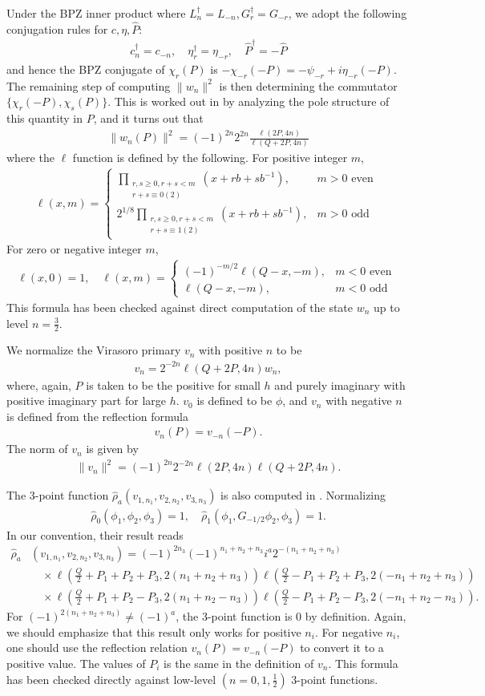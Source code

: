 \documentclass[12pt]{article}
\newcommand{\ie}{\begin{equation}\begin{aligned}}
\newcommand{\fe}{\end{aligned}\end{equation}}
\numberwithin{equation}{section}
\begin{document}
Under the BPZ inner product where $L_n^\dagger = L_{-n}, G_{r}^\dagger = G_{-r}$, we adopt the following conjugation rules for $c, \eta, \hat{P}$:
\ie
c^\dagger_n = c_{-n},\quad \eta_{r}^\dagger = \eta_{-r}, \quad \hat{P}^\dagger = -\hat{P}
\fe
and hence the BPZ conjugate of $\chi_{r}(P)$ is $-{\chi}_{-r}(-P) = -\psi_{-r}+i\eta_{-r}(-P)$. The remaining step of computing $\|w_n\|^2$ is then determining the commutator $\{\chi_r(-P), \chi_s(P)\}$. This is worked out in \cite{1312.4520} by analyzing the pole structure of this quantity in $P$, and it turns out that
\ie
\|w_n(P)\|^2 = (-1)^{2n} 2^{2n} \frac{\ell(2P,4n)}{\ell(Q+2P,4n)}
\fe
where the $\ell$ function is defined by the following. For positive integer $m$,
\ie
\ell(x, m)= \begin{cases}\prod_{\substack{r, s \geq 0, r+s<m \\ r+s \equiv 0(2)}}\left(x+r b+s b^{-1}\right), & m>0 \text { even } \\ 2^{1 / 8} \prod_{\substack{r, s \geq 0, r+s<m \\ r+s \equiv 1(2)}}\left(x+r b+s b^{-1}\right), & m>0 \text { odd }\end{cases}
\fe
For zero or negative integer $m$, 
\ie
\ell(x, 0)=1, \quad \ell(x, m)= \begin{cases}(-1)^{-m / 2} \ell(Q-x,-m), & m<0 \text { even } \\ \ell(Q-x,-m), & m<0 \text { odd }\end{cases}
\fe
This formula has been checked against direct computation of the state $w_n$ up to level $n=\frac{3}{2}$.

We normalize the Virasoro primary $v_n$ with positive $n$ to be
\ie
v_n = 2^{-2n} \ell(Q+2P, 4n)w_n,
\fe
where, again, $P$ is taken to be the positive for small $h$ and purely imaginary with positive imaginary part for large $h$. $v_0$ is defined to be $\phi$, and $v_{n}$ with negative $n$ is defined from the reflection formula
\ie
v_n(P) = v_{-n}(-P).
\fe
The norm of $v_n$ is given by
\ie
\|v_n\|^2 = (-1)^{2n}2^{-2n} \ell(2P, 4n)\ell(Q+2P, 4n).
\fe

The 3-point function $\hat{\rho}_a(v_{1,n_1},v_{2,n_2},v_{3,n_3})$ is also computed in \cite{1312.4520}. Normalizing
\ie
\hat{\rho}_0(\phi_1, \phi_2, \phi_3) = 1,\quad \hat{\rho}_1(\phi_1, G_{-1/2}\phi_2, \phi_3)=1.
\fe
In our convention, their result reads
\ie
\hat{\rho}_a&(v_{1,n_1},v_{2,n_2},v_{3,n_3}) =(-1)^{2n_3} (-1)^{n_1+n_2+n_3}i^a 2^{-\left(n_1+n_2+n_3\right)}  \\
&\quad \times \ell\left(\tfrac{Q}{2}+P_1+P_2+P_3, 2(n_1+n_2+n_3)\right)\ell\left(\tfrac{Q}{2}-P_1+P_2+P_3, 2(-n_1+n_2+n_3)\right)\\
&\quad \times \ell\left(\tfrac{Q}{2}+P_1+P_2-P_3, 2(n_1+n_2-n_3)\right) \ell\left(\tfrac{Q}{2}-P_1+P_2-P_3, 2(-n_1+n_2-n_3)\right).
\fe
For $(-1)^{2(n_1+n_2+n_3)}\neq (-1)^a$, the 3-point function is 0 by definition. Again, we should emphasize that this result only works for positive $n_i$. For negative $n_i$, one should use the reflection relation $v_n(P)=v_{-n}(-P)$ to convert it to a positive value. The values of $P_i$ is the same in the definition of $v_n$. This formula has been checked directly against low-level $(n=0,1,\frac{1}{2})$ 3-point functions.
\end{document}

